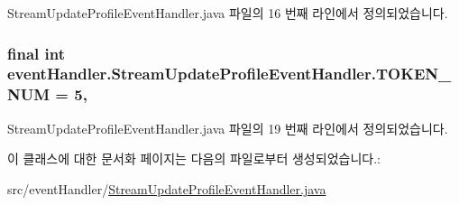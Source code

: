 Stream\+Update\+Profile\+Event\+Handler.\+java 파일의 16 번째 라인에서 정의되었습니다.

\hypertarget{classevent_handler_1_1_stream_update_profile_event_handler_aeb1ccf4c9cc4e91dcb585e0c9bb3fbfe}{
\subsubsection[{T\+O\+K\+E\+N\+\_\+\+N\+U\+M}]{\setlength{\rightskip}{0pt plus 5cm}final int event\+Handler.\+Stream\+Update\+Profile\+Event\+Handler.\+T\+O\+K\+E\+N\+\_\+\+N\+U\+M = 5\hspace{0.3cm}{\ttfamily [static]}, {\ttfamily [private]}}}\label{classevent_handler_1_1_stream_update_profile_event_handler_aeb1ccf4c9cc4e91dcb585e0c9bb3fbfe}


Stream\+Update\+Profile\+Event\+Handler.\+java 파일의 19 번째 라인에서 정의되었습니다.



이 클래스에 대한 문서화 페이지는 다음의 파일로부터 생성되었습니다.\+:\begin{DoxyCompactItemize}
\item 
src/event\+Handler/\hyperlink{_stream_update_profile_event_handler_8java}{Stream\+Update\+Profile\+Event\+Handler.\+java}\end{DoxyCompactItemize}
